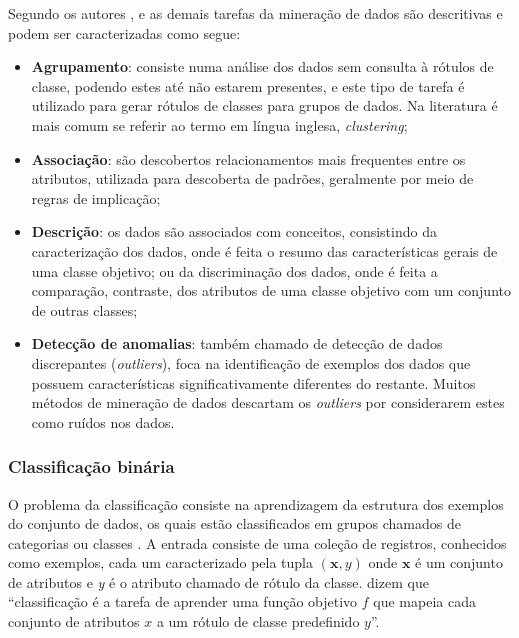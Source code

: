         
        
        Segundo os autores ,  e  as demais tarefas da mineração de dados são descritivas e podem ser caracterizadas como segue:
        \begin{itemize}
            \item \textbf{Agrupamento}: consiste numa análise dos dados sem consulta à rótulos de classe, podendo estes até não estarem presentes, e este tipo de tarefa é utilizado para gerar rótulos de classes para grupos de dados. Na literatura é mais comum se referir ao termo em língua inglesa, \textit{clustering};
            
            \item \textbf{Associação}: são descobertos relacionamentos mais frequentes entre os atributos, utilizada para descoberta de padrões, geralmente por meio de regras de implicação;
            
            \item \textbf{Descrição}: os dados são associados com conceitos, consistindo da caracterização dos dados, onde é feita o resumo das características gerais de uma classe objetivo; ou da discriminação dos dados, onde é feita a comparação, contraste, dos atributos de uma classe objetivo com um conjunto de outras classes;
            
            \item \textbf{Detecção de anomalias}: também chamado de detecção de dados discrepantes (\textit{outliers}), foca na identificação de exemplos dos dados que possuem características significativamente diferentes do restante. Muitos métodos de mineração de dados descartam os \textit{outliers} por considerarem estes como ruídos nos dados.
        \end{itemize}
    
        \subsubsection{Classificação binária} \label{subsubsec:Classificação-binária}
            O problema da classificação consiste na aprendizagem da estrutura dos exemplos do conjunto de dados, os quais estão classificados em grupos chamados de categorias ou classes \cite[p.~285]{Aggarwal_DMTT_2015}.
            A entrada consiste de uma coleção de registros, conhecidos como exemplos, cada um caracterizado pela tupla $(\textbf{x},y)$ onde $\textbf{x}$ é um conjunto de atributos e \textit{y} é o atributo chamado de rótulo da classe.
             dizem que ``classificação é a tarefa de aprender uma função objetivo $f$ que mapeia cada conjunto de atributos $x$ a um rótulo de classe predefinido $y$''.
        
